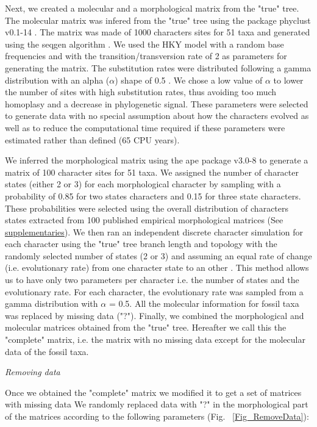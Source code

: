 \documentclass[12pt,letterpaper]{article}
\renewcommand{\subsection}[1]{%
\bigskip
\begin{center}
\begin{large}
\normalfont\itshape #1
\end{large}
\end{center}}
\begin{document}
Next, we created a molecular and a morphological matrix from the "true" tree.
The molecular matrix was infered from the "true" tree using the package phyclust v0.1-14 \citep{chen2011}.
The matrix was made of 1000 characters sites for 51 taxa and generated using the seqgen algorithm \citep{ ranbaut1997seqgen}.
We used the HKY model \citep{HKY85} with a random base frequencies and with the transition/transversion rate of 2 \citep{douadycomparison2003} as parameters for generating the matrix.
The substitution rates were distributed following a gamma distribution with an alpha ($\alpha$) shape of 0.5 \citep{yangamong-site1996}.
We chose a low value of $\alpha$ to lower the number of sites with high substitution rates, thus avoiding too much homoplasy and a decrease in phylogenetic signal.
These parameters were selected to generate data with no special assumption about how the characters evolved as well as to reduce the computational time required if these parameters were estimated rather than defined (65 CPU years).

We inferred the morphological matrix using the ape package v3.0-8 \citep{paradisape:2004} to generate a matrix of 100 character sites for 51 taxa.
We assigned the number of character states (either 2 or 3) for each morphological character by sampling with a probability of 0.85 for two states characters and 0.15 for three state characters.
These probabilities were selected using the overall distribution of characters states extracted from 100 published empirical morphological matrices (See \hyperref[supplementaries]{supplementaries}).
We then ran an independent discrete character simulation for each character using the "true" tree branch length and topology with the randomly selected number of states (2 or 3) and assuming an equal rate of change (i.e. evolutionary rate) from one character state to an other \citep{Pagel22011994}.
This method allows us to have only two parameters per character i.e. the number of states and the evolutionary rate.
For each character, the evolutionary rate was sampled from a gamma distribution with $\alpha$ = 0.5. 
All the molecular information for fossil taxa was replaced by missing data ("?").
Finally, we combined the morphological and molecular matrices obtained from the "true" tree.
Hereafter we call this the "complete" matrix, i.e. the matrix with no missing data except for the molecular data of the fossil taxa.

\subsection{Removing data}
Once we obtained the "complete" matrix we modified it to get a set of matrices with missing data
We randomly replaced data with "?" in the morphological part of the matrices according to the following parameters (Fig. ~\ref{Fig_RemoveData}):
\end{document}
